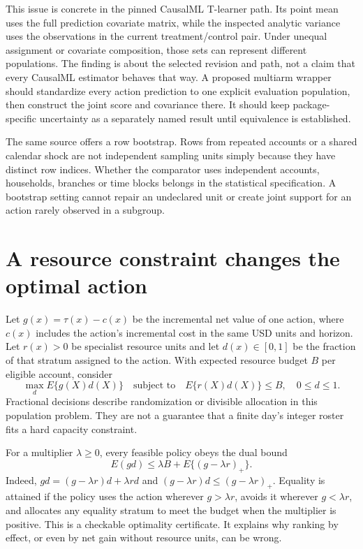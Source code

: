 This issue is concrete in the pinned CausalML T-learner path. Its point mean
uses the full prediction covariate matrix, while the inspected analytic
variance uses the observations in the current treatment/control pair. Under
unequal assignment or covariate composition, those sets can represent
different populations. The finding is about the selected revision and path,
not a claim that every CausalML estimator behaves that way. A proposed
multiarm wrapper should standardize every action prediction to one explicit
evaluation population, then construct the joint score and covariance there.
It should keep package-specific uncertainty as a separately named result
until equivalence is established.~\citep{exec14_causalml_primary,exec17_s4_paths}

The same source offers a row bootstrap. Rows from repeated accounts or a
shared calendar shock are not independent sampling units simply because they
have distinct row indices. Whether the comparator uses independent accounts,
households, branches or time blocks belongs in the statistical specification.
A bootstrap setting cannot repair an undeclared unit or create joint support
for an action rarely observed in a subgroup.

\section{A resource constraint changes the optimal action}
\label{exec17:s4-allocation}

Let $g(x)=\tau(x)-c(x)$ be the incremental net value of one action, where
$c(x)$ includes the action's incremental cost in the same USD units and
horizon. Let $r(x)>0$ be specialist resource units and let $d(x)\in[0,1]$
be the fraction of that stratum assigned to the action. With expected
resource budget $B$ per eligible account, consider
\begin{equation}
 \max_d E\{g(X)d(X)\}\quad\text{subject to}\quad
 E\{r(X)d(X)\}\leq B,\quad 0\leq d\leq1.
 \label{exec17:s4-resource-problem}
\end{equation}
Fractional decisions describe randomization or divisible allocation in this
population problem. They are not a guarantee that a finite day's integer
roster fits a hard capacity constraint.

For a multiplier $\lambda\geq0$, every feasible policy obeys the dual bound
\begin{equation}
 E(gd)\leq \lambda B+E\{(g-\lambda r)_+\}.
 \label{exec17:s4-resource-dual}
\end{equation}
Indeed, $gd=(g-\lambda r)d+\lambda rd$ and
$(g-\lambda r)d\leq(g-\lambda r)_+$. Equality is attained if the policy
uses the action wherever $g>\lambda r$, avoids it wherever $g<\lambda r$,
and allocates any equality stratum to meet the budget when the multiplier is
positive. This is a checkable optimality certificate. It explains why ranking
by effect, or even by net gain without resource units, can be wrong.

